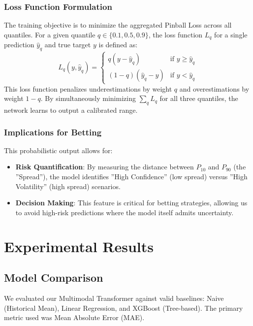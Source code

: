 \documentclass[conference]{IEEEtran}
\begin{document}
\subsubsection{Loss Function Formulation}
The training objective is to minimize the aggregated Pinball Loss across all quantiles. For a given quantile $q \in \{0.1, 0.5, 0.9\}$, the loss function $L_q$ for a single prediction $\hat{y}_q$ and true target $y$ is defined as:
\begin{equation}
L_q(y, \hat{y}_q) = 
\begin{cases} 
    q(y - \hat{y}_q) & \text{if } y \ge \hat{y}_q \\
    (1-q)(\hat{y}_q - y) & \text{if } y < \hat{y}_q
\end{cases}
\label{eq:pinball}
\end{equation}
This loss function penalizes underestimations by weight $q$ and overestimations by weight $1-q$. By simultaneously minimizing $\sum_{q} L_q$ for all three quantiles, the network learns to output a calibrated range.

\subsubsection{Implications for Betting}
This probabilistic output allows for:
\begin{itemize}
    \item \textbf{Risk Quantification}: By measuring the distance between $P_{10}$ and $P_{90}$ (the ''Spread''), the model identifies ''High Confidence'' (low spread) versus ''High Volatility'' (high spread) scenarios.
    \item \textbf{Decision Making}: This feature is critical for betting strategies, allowing us to avoid high-risk predictions where the model itself admits uncertainty.
\end{itemize}

\section{Experimental Results}

\subsection{Model Comparison}
We evaluated our Multimodal Transformer against valid baselines: Naive (Historical Mean), Linear Regression, and XGBoost (Tree-based). The primary metric used was Mean Absolute Error (MAE).
\end{document}
